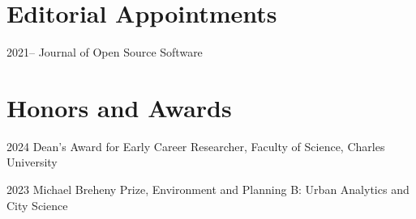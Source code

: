 \documentclass[11pt,a4paper]{report}
\begin{document}
    \section*{Editorial Appointments}

    \begin{tablist}

        \item[2021--] \tab{}Journal of Open Source Software

    \end{tablist}

    \section*{Honors and Awards}

    \begin{tablist}

        \item[2024] \tab{}Dean's Award for Early Career Researcher, Faculty of Science, Charles University
        \item[2023] \tab{}Michael Breheny Prize, Environment and Planning B: Urban Analytics and City Science

    \end{tablist}






\end{document}
